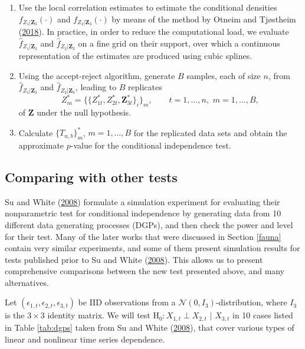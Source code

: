 \documentclass[
  12pt,
  letterpaper]{article}
\providecommand{\tightlist}{%
  \setlength{\itemsep}{0pt}\setlength{\parskip}{0pt}}
\newcommand{\Z}{\bm{Z}}
\theoremstyle{definition}
\theoremstyle{definition}
\theoremstyle{definition}
\theoremstyle{remark}
\begin{document}
\begin{enumerate}
\def\labelenumi{\arabic{enumi}.}
\tightlist
\item
  Use the local correlation estimates to estimate the conditional densities \(f_{Z_1|\Z_3}(\cdot)\) and \(f_{Z_2|\Z_3}(\cdot)\) by means of the method by Otneim and Tjøstheim (\protect\hyperlink{ref-otneim2017conditional}{2018}). In practice, in order to reduce the computational load, we evaluate \(\widehat f_{Z_1|\Z_3}\) and \(\widehat f_{Z_2|\Z_3}\) on a fine grid on their support, over which a continuous representation of the estimates are produced using cubic splines.
\item
  Using the accept-reject algorithm, generate \(B\) samples, each of size \(n\), from \(\widehat f_{Z_1|\Z_3}\) and \(\widehat f_{Z_2|\Z_3}\), leading to \(B\) replicates
  \[Z_m^* = \Big\{\{Z_{1t}^*, Z_{2t}^*, \Z_{3t}^*\}_i\Big\}_m, \qquad t = 1,\ldots,n, \,\, m = 1,\ldots,B,\]
  of \(\Z\) under the null hypothesis.
\item
  Calculate \(\{T_{n,b}\}_m^*\), \(m = 1,\ldots,B\) for the replicated data sets and obtain the approximate \(p\)-value for the conditional independence test.
\end{enumerate}

\hypertarget{chap:testexamples}{%
\subsection{Comparing with other tests}\label{chap:testexamples}}

Su and White (\protect\hyperlink{ref-su2008nonparametric}{2008}) formulate a simulation experiment for evaluating their nonparametric test for conditional independence by generating data from 10 different data generating processes (DGPs), and then check the power and level for their test. Many of the later works that were discussed in Section \ref{fauna} contain very similar experiments, and some of them present simulation results for tests published prior to Su and White (\protect\hyperlink{ref-su2008nonparametric}{2008}). This allows us to present comprehensive comparisons between the new test presented above, and many alternatives.

Let \((\epsilon_{1,t}, \epsilon_{2,t}, \epsilon_{3,t})\) be IID observations from a \(\mathcal{N}(0, I_3)\)-distribution, where \(I_3\) is the \(3\times3\) identity matrix. We will test H\(_0: X_{1,t} \perp X_{2,t} \,\,|\,\, X_{3,t}\) in 10 cases listed in Table \ref{tab:dgps} taken from Su and White (\protect\hyperlink{ref-su2008nonparametric}{2008}), that cover various types of linear and nonlinear time series dependence.
\end{document}
